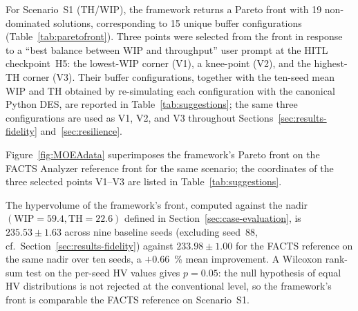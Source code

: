 \documentclass[a4paper,fleqn]{cas-sc}
\begin{document}
             
For Scenario~S1 (TH/WIP), the framework returns a Pareto front with 19                                            
  non-dominated solutions, corresponding to 15 unique buffer configurations                                         
  (Table~\ref{tab:paretofront}). Three points were selected from the front                                          
  in response to a ``best balance between WIP and throughput'' user prompt                                          
  at the HITL checkpoint~H5: the lowest-WIP corner (V1), a knee-point (V2),                                         
  and the highest-TH corner (V3). Their buffer configurations, together                                             
  with the ten-seed mean WIP and TH obtained by re-simulating each                                                  
  configuration with the canonical Python DES, are reported in                                                      
  Table~\ref{tab:suggestions}; the same three configurations are used as                                            
  V1, V2, and V3 throughout Sections~\ref{sec:results-fidelity}                                                     
  and~\ref{sec:resilience}. 

  Figure~\ref{fig:MOEAdata} superimposes the framework's Pareto front on the FACTS Analyzer reference front for the same scenario; the coordinates of the three selected points V1--V3 are listed in Table~\ref{tab:suggestions}.
                                                                                                                    
  The hypervolume of the framework's front, computed against the nadir                                              
  $(\mathrm{WIP}=59.4, \mathrm{TH}=22.6)$ defined in        
  Section~\ref{sec:case-evaluation}, is $235.53 \pm 1.63$ across nine                                               
  baseline seeds (excluding seed~88, cf.\ Section~\ref{sec:results-fidelity})                                       
  against $233.98 \pm 1.00$ for the FACTS reference on the same nadir over                                          
  ten seeds, a $+0.66$~\% mean improvement. A Wilcoxon rank-sum test on the                                         
  per-seed HV values gives $p = 0.05$: the null hypothesis of equal HV                                              
  distributions is not rejected at the conventional level, so the                                                   
  framework's front is comparable the FACTS                                               
  reference on Scenario~S1.                                                                                         
                                                                                                                    
\end{document}
